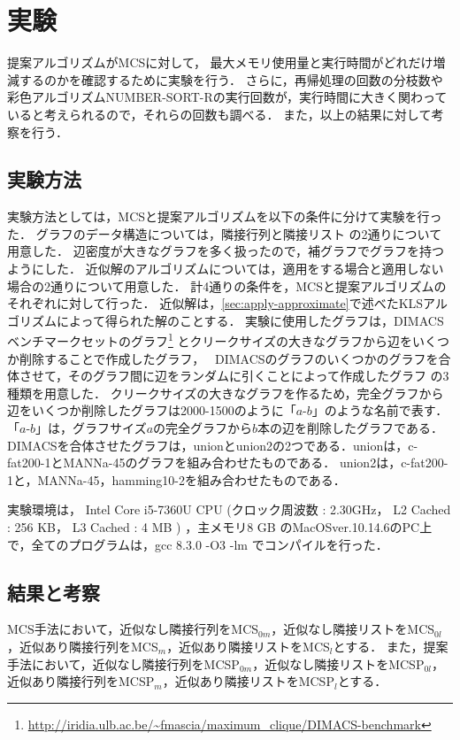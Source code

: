 \chapter{実験}
\label{ch:ex}

提案アルゴリズムがMCSに対して，
最大メモリ使用量と実行時間がどれだけ増減するのかを確認するために実験を行う．
さらに，再帰処理の回数の分枝数や彩色アルゴリズムNUMBER-SORT-Rの実行回数が，実行時間に大きく関わっていると考えられるので，それらの回数も調べる．%
また，以上の結果に対して考察を行う．
\section{実験方法}
実験方法としては，MCSと提案アルゴリズムを以下の条件に分けて実験を行った．
グラフのデータ構造については，隣接行列と隣接リスト
の2通りについて用意した．
辺密度が大きなグラフを多く扱ったので，補グラフでグラフを持つようにした．
近似解のアルゴリズムについては，適用をする場合と適用しない場合の2通りについて用意した．
計4通りの条件を，MCSと提案アルゴリズムのそれぞれに対して行った．
近似解は，\ref{sec:apply-approximate}で述べたKLSアルゴリズムによって得られた解のことする．
実験に使用したグラフは，DIMACSベンチマークセットのグラフ\footnote{\url{http://iridia.ulb.ac.be/~fmascia/maximum_clique/DIMACS-benchmark}}
とクリークサイズの大きなグラフから辺をいくつか削除することで作成したグラフ，　
DIMACSのグラフのいくつかのグラフを合体させて，そのグラフ間に辺をランダムに引くことによって作成したグラフ
の3種類を用意した．
クリークサイズの大きなグラフを作るため，完全グラフから辺をいくつか削除したグラフは2000-1500のように「$a$-$b$」のような名前で表す．
「$a$-$b$」は，グラフサイズ$a$の完全グラフから$b$本の辺を削除したグラフである．
DIMACSを合体させたグラフは，unionとunion2の2つである．unionは，c-fat200-1とMANNa-45のグラフを組み合わせたものである．
union2は，c-fat200-1と，MANNa-45，hamming10-2を組み合わせたものである．

実験環境は，
Intel Core i5-7360U CPU
(クロック周波数 : 2.30GHz，
L2 Cached : 256 KB，
L3 Cached : 4 MB
)
，主メモリ8 GB のMacOSver.10.14.6のPC上で，全てのプログラムは，gcc 8.3.0 -O3 -lm でコンパイルを行った．


\section{結果と考察}
MCS手法において，近似なし隣接行列をMCS$_{0m}$，近似なし隣接リストをMCS$_{0l}$，近似あり隣接行列をMCS$_{m}$，近似あり隣接リストをMCS$_{l}$とする．
また，提案手法において，近似なし隣接行列をMCSP$_{0m}$，近似なし隣接リストをMCSP$_{0l}$，近似あり隣接行列をMCSP$_{m}$，近似あり隣接リストをMCSP$_{l}$とする．

